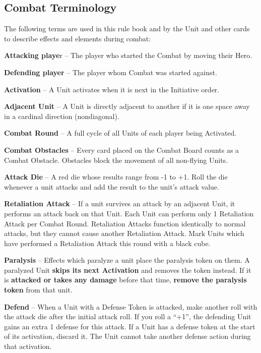 \begin{multicols*}{2}
\subsection*{\hypertarget{Combatterminology}{Combat Terminology}}
The following terms are used in this rule book and by the Unit and other cards to describe effects and elements during combat:\par
\textbf{Attacking playe}r – The player who started the Combat by moving their Hero.\par
\textbf{Defending player} – The player whom Combat was started against.\par
\textbf{Activation} – A Unit activates when it is next in the Initiative order.\par
\textbf{Adjacent Unit} – A Unit is directly adjacent to another if it is one space away in a cardinal direction (nondiagonal).\par
\textbf{Combat Round} – A full cycle of all Units of each player being Activated.\par
\textbf{Combat Obstacles} – Every card placed on the Combat Board counts as a Combat Obstacle.
Obstacles block the movement of all non-flying Units.\par
\textbf{Attack Die} – A red die whose results range from -1 to +1.
Roll the die whenever a unit attacks and
add the result to the unit's attack value.\par
\textbf{\hypertarget{Retaliate}{Retaliation Attack}} – If a unit survives an attack by an adjacent Unit, it performs an attack back on that Unit.
Each Unit can perform only 1 Retaliation Attack per Combat Round.
Retaliation Attacks function identically to normal attacks, but they cannot cause another Retaliation Attack.
Mark Units which have performed a Retaliation Attack this round with a black cube.\par
\textbf{Paralysis}  – Effects which paralyze a unit place the paralysis token on them.
A paralyzed Unit \textbf{skips its next Activation} and removes the token instead.
If it is \textbf{attacked or takes any damage} before that time, \textbf{remove the paralysis token} from that unit.\par
\textbf{\hypertarget{Defend}{Defend}}  – When a Unit with a Defense Token is attacked, make another roll with the attack die
after the initial attack roll.
If you roll a “+1”, the defending Unit gains an extra 1 defense for this attack.
If a Unit has a defense token at the start of its activation, discard it.
The Unit cannot take another defense action during that activation.


\end{multicols*}
